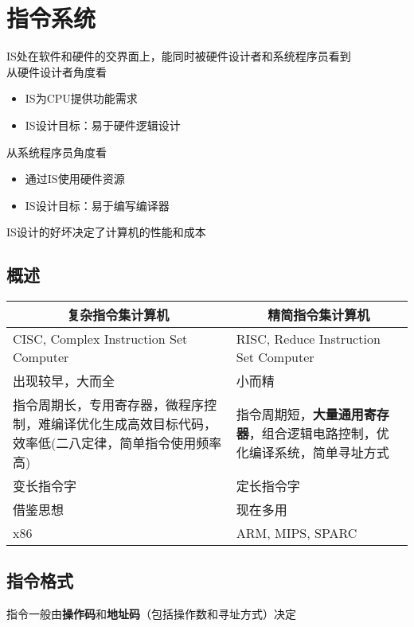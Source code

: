
\section{指令系统}
IS处在软件和硬件的交界面上，能同时被硬件设计者和系统程序员看到\\
从硬件设计者角度看
\begin{itemize}
	\item IS为CPU提供功能需求
	\item IS设计目标：易于硬件逻辑设计
\end{itemize}
从系统程序员角度看
\begin{itemize}
	\item 通过IS使用硬件资源
	\item IS设计目标：易于编写编译器
\end{itemize}
IS设计的好坏决定了计算机的性能和成本

\subsection{概述}
\begin{center}
\begin{tabular}{|m{8cm}|m{8cm}|}
\hline
\multicolumn{1}{|c|}{复杂指令集计算机} & \multicolumn{1}{c|}{精简指令集计算机} \\\hline
CISC, Complex Instruction Set Computer & RISC, Reduce Instruction Set Computer\\\hline
出现较早，大而全 & 小而精 \\\hline
指令周期长，专用寄存器，微程序控制，难编译优化生成高效目标代码，效率低(二八定律，简单指令使用频率高) & 指令周期短，\textbf{大量通用寄存器}，组合逻辑电路控制，优化编译系统，简单寻址方式\\\hline
变长指令字 & 定长指令字 \\\hline
借鉴思想 & 现在多用 \\\hline
x86 & ARM, MIPS, SPARC \\\hline
\end{tabular}
\end{center}

\subsection{指令格式}
指令一般由\textbf{操作码}和\textbf{地址码}（包括操作数和寻址方式）决定

